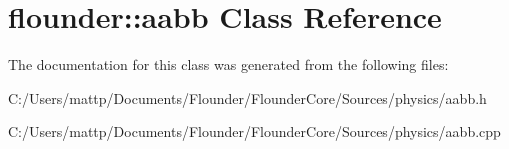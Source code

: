 \hypertarget{classflounder_1_1aabb}{}\section{flounder\+:\+:aabb Class Reference}
\label{classflounder_1_1aabb}


The documentation for this class was generated from the following files\+:\begin{DoxyCompactItemize}
\item 
C\+:/\+Users/mattp/\+Documents/\+Flounder/\+Flounder\+Core/\+Sources/physics/aabb.\+h\item 
C\+:/\+Users/mattp/\+Documents/\+Flounder/\+Flounder\+Core/\+Sources/physics/aabb.\+cpp\end{DoxyCompactItemize}
